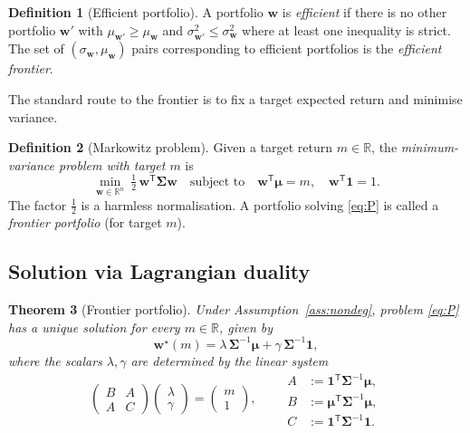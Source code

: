 \documentclass[11pt]{article}
\theoremstyle{definition}
\newtheorem{definition}{Definition}[section]
\theoremstyle{plain}
\newtheorem{theorem}[definition]{Theorem}
\newcommand{\R}{\mathbb{R}}
\newcommand{\one}{\mathbf{1}}
\newcommand{\bw}{\bm{w}}
\newcommand{\bmu}{\bm{\mu}}
\newcommand{\bSigma}{\bm{\Sigma}}
\newcommand{\T}{^{\mathsf{T}}}
\begin{document}
\begin{definition}[Efficient portfolio]\label{def:eff}
A portfolio $\bw$ is \emph{efficient} if there is no other portfolio
$\bw'$ with $\mu_{\bw'} \ge \mu_{\bw}$ and $\sigma_{\bw'}^2 \le \sigma_{\bw}^2$
where at least one inequality is strict. The set of $(\sigma_{\bw}, \mu_{\bw})$
pairs corresponding to efficient portfolios is the \emph{efficient frontier}.
\end{definition}

The standard route to the frontier is to fix a target expected return and
minimise variance.

\begin{definition}[Markowitz problem]\label{def:markowitz}
Given a target return $m \in \R$, the \emph{minimum-variance problem with target
$m$} is
\begin{equation}\label{eq:P}
\min_{\bw \in \R^n} \ \tfrac{1}{2}\, \bw\T \bSigma \bw
\quad \text{subject to} \quad
\bw\T \bmu = m, \quad \bw\T \one = 1 .
\end{equation}
The factor $\tfrac12$ is a harmless normalisation. A portfolio solving
\eqref{eq:P} is called a \emph{frontier portfolio} (for target $m$).
\end{definition}

\subsection{Solution via Lagrangian duality}

\begin{theorem}[Frontier portfolio]\label{thm:frontier}
Under Assumption~\ref{ass:nondeg}, problem \eqref{eq:P} has a unique solution
for every $m \in \R$, given by
\begin{equation}\label{eq:wsol}
\bw^\star(m) = \lambda\, \bSigma^{-1} \bmu + \gamma\, \bSigma^{-1}\one,
\end{equation}
where the scalars $\lambda, \gamma$ are determined by the linear system
\[
\begin{pmatrix} B & A \\ A & C \end{pmatrix}
\begin{pmatrix} \lambda \\ \gamma \end{pmatrix}
=
\begin{pmatrix} m \\ 1 \end{pmatrix},
\qquad
\begin{aligned}
A &:= \one\T \bSigma^{-1} \bmu, \\
B &:= \bmu\T \bSigma^{-1} \bmu, \\
C &:= \one\T \bSigma^{-1} \one .
\end{aligned}
\]
\end{theorem}
\end{document}
